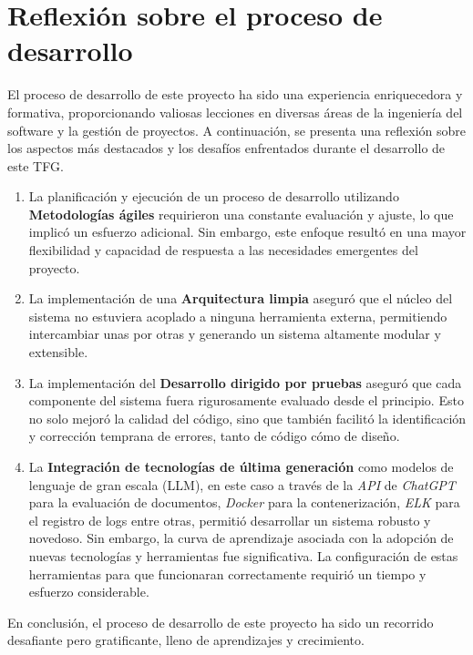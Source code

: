 \section{Reflexión sobre el proceso de desarrollo}

El proceso de desarrollo de este proyecto ha sido una experiencia enriquecedora y formativa, proporcionando valiosas
lecciones en diversas áreas de la ingeniería del software y la gestión de proyectos.
A continuación, se presenta una reflexión sobre los aspectos más destacados y los desafíos enfrentados durante el
desarrollo de este TFG.

\begin{enumerate}
    \item
    La planificación y ejecución de un proceso de desarrollo utilizando \textbf{Metodologías ágiles} requirieron una
    constante evaluación y ajuste, lo que implicó un esfuerzo adicional.
    Sin embargo, este enfoque resultó en una mayor flexibilidad y capacidad de respuesta a las necesidades emergentes
    del proyecto.
    \item
    La implementación de una \textbf{Arquitectura limpia}
    aseguró que el núcleo del sistema no estuviera acoplado a ninguna herramienta externa, permitiendo intercambiar unas
    por otras y generando un sistema altamente modular y extensible.
    \item
    La implementación del \textbf{Desarrollo dirigido por pruebas} aseguró que cada componente del sistema fuera
    rigurosamente evaluado desde el principio.
    Esto no solo mejoró la calidad del código, sino que también facilitó la identificación y corrección temprana de
    errores, tanto de código cómo de diseño.
    \item
    La \textbf{Integración de tecnologías de última generación} como modelos de lenguaje de gran escala (LLM), en este
    caso a través de la \textit{API} de \textit{ChatGPT} para la evaluación de documentos, \textit{Docker}
    para la contenerización, \textit{ELK} para el registro de logs entre otras, permitió desarrollar un sistema
    robusto y novedoso.
    Sin embargo, la curva de aprendizaje asociada con la adopción de nuevas tecnologías y herramientas fue
    significativa.
    La configuración de estas herramientas para que funcionaran correctamente requirió un tiempo y esfuerzo
    considerable.
\end{enumerate}

En conclusión, el proceso de desarrollo de este proyecto ha sido un recorrido desafiante pero gratificante, lleno de
aprendizajes y crecimiento.
